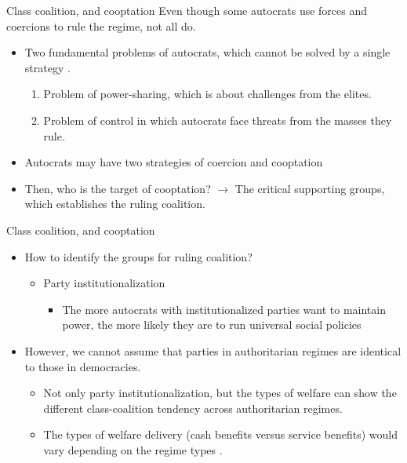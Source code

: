 \documentclass{Bredelebeamer}
\begin{document}
\begin{frame}{Class coalition, and cooptation}
Even though some autocrats use forces and coercions to rule the regime, not all do.
\begin{itemize}
	\item Two fundamental problems of autocrats, which cannot be solved by a single strategy \citep{Svolik2012}.
	\begin{enumerate}
		\item Problem of power-sharing, which is about challenges from the elites.
		\item Problem of control in which autocrats face threats from the masses they
		rule.
	\end{enumerate}
	\item Autocrats may have two strategies of coercion and cooptation \citep{Gandhi2007,Wright2008}
	\item Then, who is the target of cooptation? \pause $\rightarrow$  The critical supporting groups, which establishes the ruling coalition.
\end{itemize}
\end{frame}

\begin{frame}{Class coalition, and cooptation}
	\begin{itemize}
		\item How to identify the groups for ruling coalition?
		\begin{itemize}
			\item Party institutionalization \citep{Rasmussen2019}
			\begin{itemize}
				\item The more autocrats with institutionalized parties want to maintain power, the more likely they are to run universal social policies
			\end{itemize}
		\end{itemize}
		\item However, we cannot assume that parties in authoritarian regimes are identical to those in democracies.
		\begin{itemize}
			\item Not only party institutionalization, but the types of welfare can show the different class-coalition tendency across authoritarian regimes.
			\item The types of welfare delivery (cash benefits versus service benefits) would vary depending on the regime types \citep{Bambra2005}.
		\end{itemize}
	\end{itemize}
\end{frame}
\end{document}
